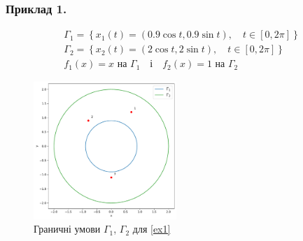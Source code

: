 \documentclass{beamer}
\numberwithin{equation}{section}
\begin{document}
	\begin{frame}
		\frametitle{Приклад 1.}
				
					
		
		{\small{
		\begin{equation}
			\label{ex1}
			\begin{array}{l}
				\displaystyle
				\Gamma_{1}=\left\{x_{1}(t)=(0.9 \cos t, 0.9 \sin t), \quad t \in[0,2 
				\pi]\right\} \\
				
				\displaystyle
				\Gamma_{2}=\left\{x_{2}(t)=(2 \cos t, 2 \sin t), \quad  t \in[0,2 \pi]\right\} \\[0.1cm]

				\displaystyle
				f_{1}(x)=x  \text { на } \Gamma_{1} \quad \text {і} \quad
				f_{2}(x)=1  \text { на } \Gamma_{2}
			\end{array}
		\end{equation}
		}}
				
		\begin{figure}
			\includegraphics[width=0.48\textwidth]{resources/curves_and_points.pdf}
			\caption{Граничні умови $\Gamma_1$, $\Gamma_2$ для \ref{ex1}}
		\end{figure}
		
	\end{frame}
\end{document}
